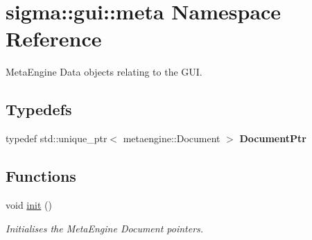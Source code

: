 \hypertarget{namespacesigma_1_1gui_1_1meta}{}\section{sigma\+:\+:gui\+:\+:meta Namespace Reference}
\label{namespacesigma_1_1gui_1_1meta}


Meta\+Engine Data objects relating to the G\+U\+I.  


\subsection*{Typedefs}
\begin{DoxyCompactItemize}
\item 
\hypertarget{namespacesigma_1_1gui_1_1meta_a3d629f427455558b2782e28f2503db16}{}typedef std\+::unique\+\_\+ptr$<$ metaengine\+::\+Document $>$ {\bfseries Document\+Ptr}\label{namespacesigma_1_1gui_1_1meta_a3d629f427455558b2782e28f2503db16}

\end{DoxyCompactItemize}
\subsection*{Functions}
\begin{DoxyCompactItemize}
\item 
\hypertarget{namespacesigma_1_1gui_1_1meta_a808e2bbfcc83285ac1971be031f5d9cb}{}void \hyperlink{namespacesigma_1_1gui_1_1meta_a808e2bbfcc83285ac1971be031f5d9cb}{init} ()\label{namespacesigma_1_1gui_1_1meta_a808e2bbfcc83285ac1971be031f5d9cb}

\begin{DoxyCompactList}\small\item\em Initialises the Meta\+Engine Document pointers. \end{DoxyCompactList}\end{DoxyCompactItemize}
